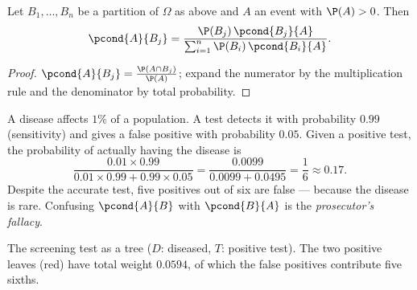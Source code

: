 \begin{theorem}\label{thm:tle:condprob:bayes}
Let $B_1, \dots, B_n$ be a partition of $\Omega$ as above and $A$ an event
with $\P(A) > 0$. Then
\[
\pcond{A}{B_j} =
\frac{\P(B_j)\,\pcond{B_j}{A}}{\sum_{i=1}^{n} \P(B_i)\,\pcond{B_i}{A}} .
\]
\end{theorem}

\begin{proof}
$\pcond{A}{B_j} = \frac{\P(A \cap B_j)}{\P(A)}$; expand the numerator by
the multiplication rule and the denominator by total probability.
\end{proof}

\begin{example}\label{ex:tle:condprob:test}
A disease affects $1\%$ of a population. A test detects it with probability
$0.99$ (sensitivity) and gives a false positive with probability $0.05$.
Given a positive test, the probability of actually having the disease is
\[
\frac{0.01 \times 0.99}{0.01\times0.99 + 0.99\times0.05}
= \frac{0.0099}{0.0099 + 0.0495} = \frac{1}{6} \approx 0.17 .
\]
Despite the accurate test, five positives out of six are false --- because
the disease is rare. Confusing $\pcond{A}{B}$ with $\pcond{B}{A}$ is the
\emph{prosecutor's fallacy}.
\end{example}

\begin{omfigure}

{\small The screening test as a tree ($D$: diseased, $T$: positive
test). The two positive leaves (red) have total weight $0.0594$, of
which the false positives contribute five sixths.}
\end{omfigure}

